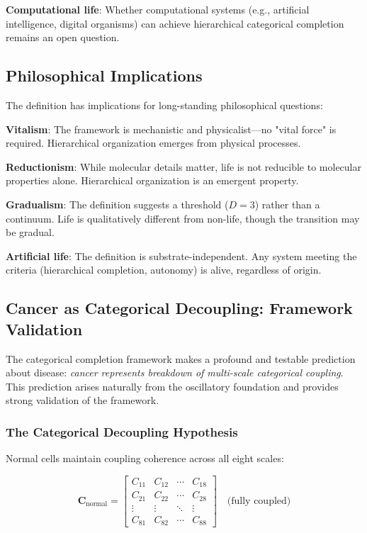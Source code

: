 \documentclass[11pt]{article}
\begin{document}
\textbf{Computational life}: Whether computational systems (e.g., artificial intelligence, digital organisms) can achieve hierarchical categorical completion remains an open question.

\subsection{Philosophical Implications}

The definition has implications for long-standing philosophical questions:

\textbf{Vitalism}: The framework is mechanistic and physicalist—no "vital force" is required. Hierarchical organization emerges from physical processes.

\textbf{Reductionism}: While molecular details matter, life is not reducible to molecular properties alone. Hierarchical organization is an emergent property.

\textbf{Gradualism}: The definition suggests a threshold ($D = 3$) rather than a continuum. Life is qualitatively different from non-life, though the transition may be gradual.

\textbf{Artificial life}: The definition is substrate-independent. Any system meeting the criteria (hierarchical completion, autonomy) is alive, regardless of origin.

\subsection{Cancer as Categorical Decoupling: Framework Validation}

The categorical completion framework makes a profound and testable prediction about disease: \textit{cancer represents breakdown of multi-scale categorical coupling}. This prediction arises naturally from the oscillatory foundation and provides strong validation of the framework.

\subsubsection{The Categorical Decoupling Hypothesis}

Normal cells maintain coupling coherence across all eight scales:

\begin{equation}
\mathbf{C}_{\text{normal}} = \begin{bmatrix}
C_{11} & C_{12} & \cdots & C_{18} \\
C_{21} & C_{22} & \cdots & C_{28} \\
\vdots & \vdots & \ddots & \vdots \\
C_{81} & C_{82} & \cdots & C_{88}
\end{bmatrix} \quad \text{(fully coupled)}
\end{equation}
\end{document}
